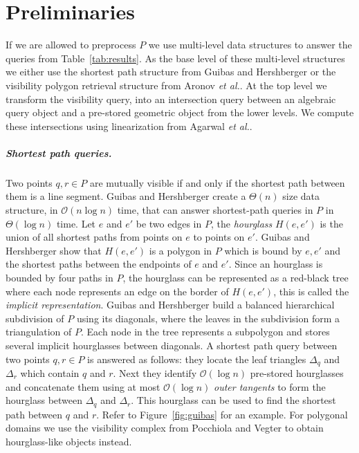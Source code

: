 \documentclass[a4paper, UKenglish]{lipics-v2018}
\newcommand{\etal}{\textit{et al.}\xspace}
\begin{document}
\section{Preliminaries}
\label{sec:prelims}

If we are allowed to preprocess $P$ we use multi-level data structures to answer the queries from Table~\ref{tab:results}. As the base level of these multi-level structures we either use the shortest path structure from Guibas and Hershberger \cite{guibas1989optimal} or the visibility polygon retrieval structure from Aronov \etal \cite{aronov2002visibility}. At the top level we transform the visibility query, into an intersection query between an algebraic query object and a pre-stored geometric object from the lower levels. We compute these intersections using linearization from Agarwal \etal \cite{agarwal2013range}.


\subparagraph{Shortest path queries.}
Two points $q,r \in P$ are mutually visible if and only if the shortest path between them is a line segment.  Guibas and Hershberger \cite{guibas1989optimal} create a $\Theta(n)$ size data structure, in $\mathcal{O}(n \log n)$ time, that can answer shortest-path queries in $P$ in $\Theta(\log n)$ time. Let $e$ and $e'$ be two edges in $P$, the \emph{hourglass} $H(e, e')$ is the union of all shortest paths from points on $e$ to points on $e'$. Guibas and Hershberger show that $H(e, e')$ is a polygon in $P$ which is bound by $e, e'$ and the shortest paths between the endpoints of $e$ and $e'$. Since an hourglass is bounded by four paths in $P$, the hourglass can be represented as a red-black tree where each node represents an edge on the border of $H(e, e')$, this is called the \emph{implicit representation}. 
Guibas and Hershberger build a balanced hierarchical subdivision of $P$ using its diagonals, where the leaves in the subdivision form a triangulation of $P$. Each node in the tree represents a subpolygon and stores several implicit hourglasses between diagonals. A shortest path query between two points $q,r \in P$ is answered as follows: they locate the leaf triangles $\Delta_q$ and $\Delta_r$ which contain $q$ and $r$. Next they identify  $\mathcal{O}(\log n)$ pre-stored hourglasses and concatenate them using at most $\mathcal{O}(\log n)$ \emph{outer tangents} to form the hourglass between $\Delta_q$ and $\Delta_r$. This hourglass can be used to find the shortest path between $q$ and $r$. Refer to Figure~\ref{fig:guibas} for an example. For polygonal domains we use the visibility complex from Pocchiola and Vegter \cite{pocchiola1996visibility} to obtain hourglass-like objects instead.
\end{document}
